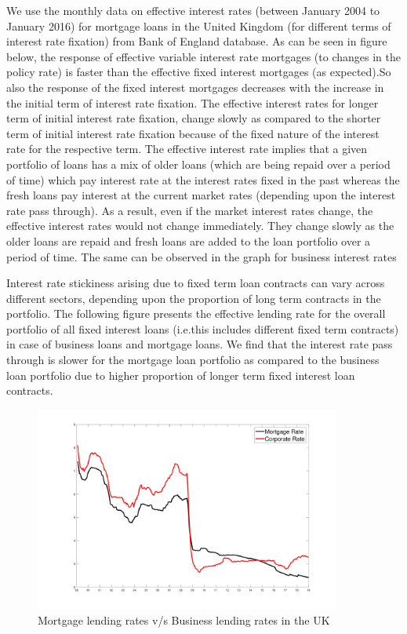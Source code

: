 \documentclass[12pt]{article}
\numberwithin{equation}{section}
\begin{document}
We use the monthly data on effective interest rates (between January 2004 to January 2016)  for mortgage loans in the United Kingdom (for different terms of interest rate fixation) from Bank of England database.
As can be seen in figure below, the response of effective variable interest rate mortgages (to changes in the policy rate) is faster than the effective fixed interest mortgages (as expected).So also the response of the fixed interest mortgages decreases with the increase in the initial term of interest rate fixation.
The effective interest rates for longer term of initial interest rate fixation, change slowly as compared to the shorter term of initial interest rate fixation  because of the fixed nature of the interest rate for the respective term. The effective interest rate implies that a given portfolio of loans has a mix of older loans (which are being repaid over a period of time) which pay interest rate at the interest rates fixed in the past whereas the fresh loans pay interest at the current market rates (depending upon the interest rate pass through). As a result, even if the market interest rates change, the effective interest rates would not change immediately. They change slowly as the older loans are repaid and fresh loans are added to the loan portfolio over a period of time. The same can be observed in the graph for business interest rates

Interest rate stickiness arising due to fixed term loan contracts can vary across different sectors, depending upon the proportion of long term contracts in the portfolio. The following figure presents the effective lending rate for the overall portfolio of all fixed interest loans  (i.e.this includes different fixed term contracts) in case of business loans and mortgage loans. We find that the interest rate pass through is slower for the mortgage loan portfolio as compared to the business loan portfolio due to higher proportion of longer term fixed interest loan contracts.

\begin{figure}[h!] 
\label{uk_all_int_rates}
	\caption{Mortgage lending rates v/s Business lending rates in the UK} 
	\centering
	
	\includegraphics[width=0.9\textwidth]{int_rate_monthly_plot.pdf}
	
\end{figure}
\end{document}
